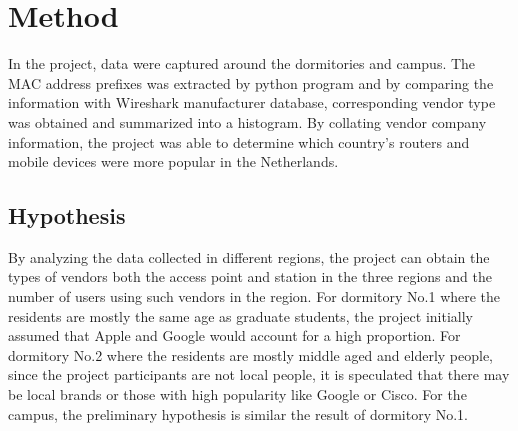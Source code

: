 \section{Method}
In the project, data were captured around the dormitories and campus. The MAC address prefixes was extracted by python program and by comparing the information with Wireshark manufacturer database, corresponding vendor type was obtained and summarized into a histogram. By collating vendor company information, the project was able to determine which country's routers and mobile devices were more popular in the Netherlands. 
\subsection{Hypothesis}
By analyzing the data collected in different regions, the project can obtain the types of vendors both the access point and station in the three regions and the number of users using such vendors in the region. For dormitory No.1 where the residents are mostly the same age as graduate students, the project initially assumed that Apple and Google would account for a high proportion. For dormitory No.2 where the residents are mostly middle aged and elderly people, since the project participants are not local people, it is speculated that there may be local brands or those with high popularity like Google or Cisco. For the campus, the preliminary hypothesis is similar the result of dormitory No.1.